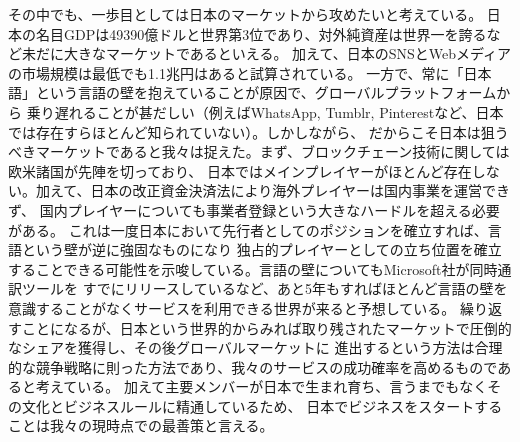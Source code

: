 \documentclass{jsarticle}
\begin{document}
その中でも、一歩目としては日本のマーケットから攻めたいと考えている。
日本の名目GDPは49390億ドルと世界第3位であり、対外純資産は世界一を誇るなど未だに大きなマーケットであるといえる。
加えて、日本のSNSとWebメディアの市場規模は最低でも1.1兆円はあると試算されている。
一方で、常に「日本語」という言語の壁を抱えていることが原因で、グローバルプラットフォームから
乗り遅れることが甚だしい（例えばWhatsApp, Tumblr, Pinterestなど、日本では存在すらほとんど知られていない）。しかしながら、
だからこそ日本は狙うべきマーケットであると我々は捉えた。まず、ブロックチェーン技術に関しては欧米諸国が先陣を切っており、
日本ではメインプレイヤーがほとんど存在しない。加えて、日本の改正資金決済法により海外プレイヤーは国内事業を運営できず、
国内プレイヤーについても事業者登録という大きなハードルを超える必要がある。
これは一度日本において先行者としてのポジションを確立すれば、言語という壁が逆に強固なものになり
独占的プレイヤーとしての立ち位置を確立することできる可能性を示唆している。言語の壁についてもMicrosoft社が同時通訳ツールを
すでにリリースしているなど、あと5年もすればほとんど言語の壁を意識することがなくサービスを利用できる世界が来ると予想している。
繰り返すことになるが、日本という世界的からみれば取り残されたマーケットで圧倒的なシェアを獲得し、その後グローバルマーケットに
進出するという方法は合理的な競争戦略に則った方法であり、我々のサービスの成功確率を高めるものであると考えている。
加えて主要メンバーが日本で生まれ育ち、言うまでもなくその文化とビジネスルールに精通しているため、
日本でビジネスをスタートすることは我々の現時点での最善策と言える。
\end{document}
